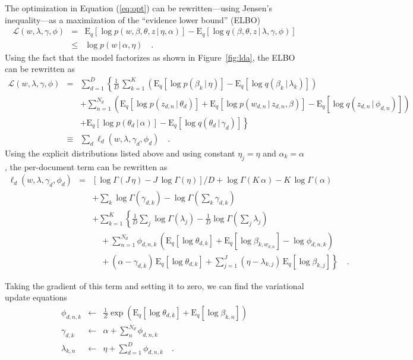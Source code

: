 \documentclass[11pt]{article}
\newcommand{\eq}[1]{Equation (\ref{eq:#1})}
\newcommand{\fig}[1]{Figure~\ref{fig:#1}}
\newcommand{\expect}[2]{\ensuremath{\mathrm{E}_{#1}\left [ {#2} \right ]}}
\begin{document}
The optimization in \eq{opt} can be rewritten---using Jensen's inequality---as
a maximization of the ``evidence lower bound'' (ELBO)
\begin{eqnarray}
\mathcal{L}(w,\lambda,\gamma,\phi) &=&
\expect{q}{\log p(w,\beta,\theta,z\,|\,\eta,\alpha)}
- \expect{q}{\log q(\beta,\theta,z\,|\,\lambda,\gamma,\phi)} \\
&\le& \log p(w\,|\,\alpha,\eta) \quad.
\end{eqnarray}
Using the fact that the model factorizes as shown in \fig{lda}, the ELBO can
be rewritten as
\begin{eqnarray}
\mathcal{L}(w,\lambda,\gamma,\phi) &=&
    \sum_{d=1}^D\left \{ \frac{1}{D}\,\sum_{k=1}^K \left (
    \expect{q}{\log p(\beta_k\,|\,\eta)}
    -\expect{q}{\log q(\beta_k\,|\,\lambda_k)} \right )\right.
\nonumber\\ &&
    +\sum_{n=1}^{N_d} \left ( \expect{q}{\log p(z_{d,n}\,|\,\theta_d)}
    +\expect{q}{\log p(w_{d,n}\,|\,z_{d,n},\beta)}
    -\expect{q}{\log q(z_{d,n}\,|\,\phi_{d,n})} \right)
\nonumber\\ &&  \left.
    +\expect{q}{\log p(\theta_d\,|\,\alpha)}
    -\expect{q}{\log q(\theta_d\,|\,\gamma_d)}
\right \} \\
&\equiv& \sum_d \ell_d (w,\lambda,\gamma_d,\phi_d) \quad.
\end{eqnarray}
Using the explicit distributions listed above and using constant $\eta_j =
\eta$ and $\alpha_k = \alpha$, the per-document term can be rewritten as
\begin{eqnarray}
\ell_d (w,\lambda,\gamma_d,\phi_d) &=&
[\log\Gamma(J\,\eta)-J\,\log\Gamma(\eta)]/D +
\log\Gamma(K\,\alpha)-K\,\log\Gamma(\alpha)
\nonumber \\
&& +\sum_k\log\Gamma(\gamma_{d,k}) -
\log\Gamma\left(\sum_k \gamma_{d,k}\right)
\nonumber\\
&& +\sum_{k=1}^K\left\{\frac{1}{D}\sum_j \log\Gamma(\lambda_j) -
\frac{1}{D}\log\Gamma\left(\sum_j \lambda_j\right)
\right. \nonumber\\
&& \quad+\sum_{n=1}^{N_d} \phi_{d,n,k}\,\left(
\expect{q}{\log\theta_{d,k}} + \expect{q}{\log\beta_{k,w_{d,n}}}
-\log\phi_{d,n,k}
\right)
\nonumber\\
&& \quad+ (\alpha-\gamma_{d,k})\,\expect{q}{\log\theta_{d,k}} +
\left.\sum_{j=1}^J (\eta-\lambda_{k,j})\,\expect{q}{\log\beta_{k,j}}
\right\} \quad.
\end{eqnarray}

Taking the gradient of this term and setting it to zero, we can find the
variational update equations
\begin{eqnarray}
\phi_{d,n,k} &\gets& \frac{1}{Z} \exp \left(\expect{q}{\log\theta_{d,k}}
+\expect{q}{\log\beta_{k,n}}\right) \\
\gamma_{d,k} &\gets& \alpha + \sum_n^{N_d} \phi_{d,n,k} \\
\lambda_{k,n} &\gets& \eta + \sum_{d=1}^{D} \phi_{d,n,k} \quad.
\end{eqnarray}
\end{document}
